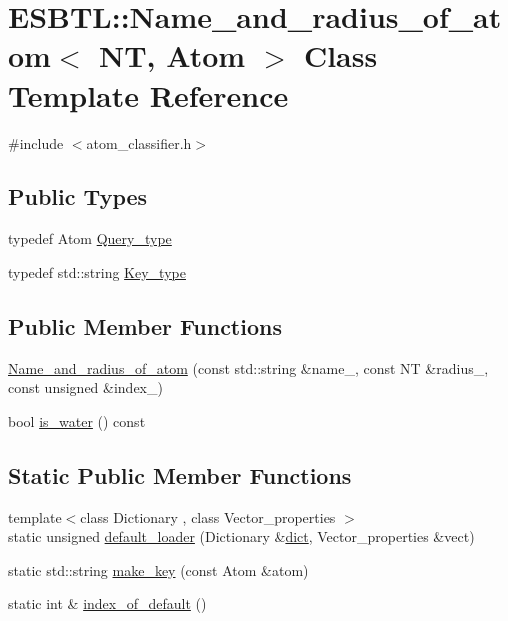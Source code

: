 \hypertarget{classESBTL_1_1Name__and__radius__of__atom}{}\section{E\+S\+B\+TL\+:\+:Name\+\_\+and\+\_\+radius\+\_\+of\+\_\+atom$<$ NT, Atom $>$ Class Template Reference}
\label{classESBTL_1_1Name__and__radius__of__atom}


{\ttfamily \#include $<$atom\+\_\+classifier.\+h$>$}

\subsection*{Public Types}
\begin{DoxyCompactItemize}
\item 
typedef Atom \hyperlink{classESBTL_1_1Name__and__radius__of__atom_a25cd0647ee4c593a1736b2abce11762d}{Query\+\_\+type}
\item 
typedef std\+::string \hyperlink{classESBTL_1_1Name__and__radius__of__atom_a29a9469912e1722a7da9d7f7f8201c55}{Key\+\_\+type}
\end{DoxyCompactItemize}
\subsection*{Public Member Functions}
\begin{DoxyCompactItemize}
\item 
\hyperlink{classESBTL_1_1Name__and__radius__of__atom_a871dcf4baf9db1bbb3f1bf50788a74b2}{Name\+\_\+and\+\_\+radius\+\_\+of\+\_\+atom} (const std\+::string \&name\+\_\+, const NT \&radius\+\_\+, const unsigned \&index\+\_\+)
\item 
bool \hyperlink{classESBTL_1_1Name__and__radius__of__atom_adf9be1a445c1b149126a57b13aa3794d}{is\+\_\+water} () const
\end{DoxyCompactItemize}
\subsection*{Static Public Member Functions}
\begin{DoxyCompactItemize}
\item 
{\footnotesize template$<$class Dictionary , class Vector\+\_\+properties $>$ }\\static unsigned \hyperlink{classESBTL_1_1Name__and__radius__of__atom_a91c9389ada2c1018646bb7fdf4a092fa}{default\+\_\+loader} (Dictionary \&\hyperlink{Tsai__jmb__99__radii_8h_a3175002a2df717ae9e433cd2210fea97}{dict}, Vector\+\_\+properties \&vect)
\item 
static std\+::string \hyperlink{classESBTL_1_1Name__and__radius__of__atom_a94255fa43c0ac992c29af1cee49233c9}{make\+\_\+key} (const Atom \&atom)
\item 
static int \& \hyperlink{classESBTL_1_1Name__and__radius__of__atom_aab55cd6cc605b2dbb917043ec7d46fab}{index\+\_\+of\+\_\+default} ()
\end{DoxyCompactItemize}
